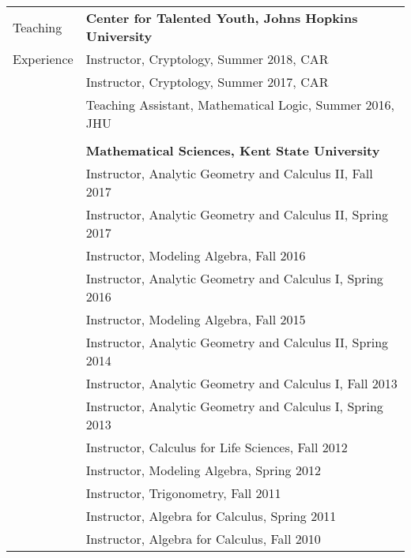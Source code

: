 \documentclass[letterpaper,10pt,oneside]{article}
\begin{document}
\noindent \begin{tabular}{@{} l l}
 \Large{Teaching}  & \textbf{Center for Talented Youth, Johns Hopkins University} \\
 \Large{Experience} & Instructor, Cryptology, Summer 2018, CAR \\
 \hspace{1.1in} & Instructor, Cryptology, Summer 2017, CAR \\
 & Teaching Assistant, Mathematical Logic, Summer 2016, JHU \\
 & \\
 & \textbf{Mathematical Sciences, Kent State University} \\
 & Instructor, Analytic Geometry and Calculus II, Fall 2017 \\
 & Instructor, Analytic Geometry and Calculus II, Spring 2017 \\
 & Instructor, Modeling Algebra, Fall 2016 \\
 & Instructor, Analytic Geometry and Calculus I, Spring 2016 \\
 & Instructor, Modeling Algebra, Fall 2015 \\
 & Instructor, Analytic Geometry and Calculus II, Spring 2014 \\
 & Instructor, Analytic Geometry and Calculus I, Fall 2013 \\
 & Instructor, Analytic Geometry and Calculus I, Spring 2013 \\
 & Instructor, Calculus for Life Sciences, Fall 2012 \\
 & Instructor, Modeling Algebra, Spring 2012 \\
 & Instructor, Trigonometry, Fall 2011 \\
 & Instructor, Algebra for Calculus, Spring 2011 \\
 & Instructor, Algebra for Calculus, Fall 2010 \\
\end{tabular}

\vfill
\end{document}
